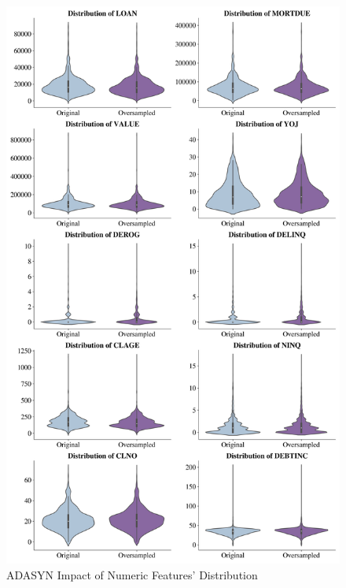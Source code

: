 \begin{figure}[H]
    \centering
    \caption{ADASYN Impact of Numeric Features' Distribution}\vspace{0.5em}
    \label{fig:adasynimpactnum}
    \includegraphics[width=140mm]{Figures/Numeric_Features_Distribution_OS_Violinplots.jpg}
    
    \vspace{-1em}
\end{figure}


